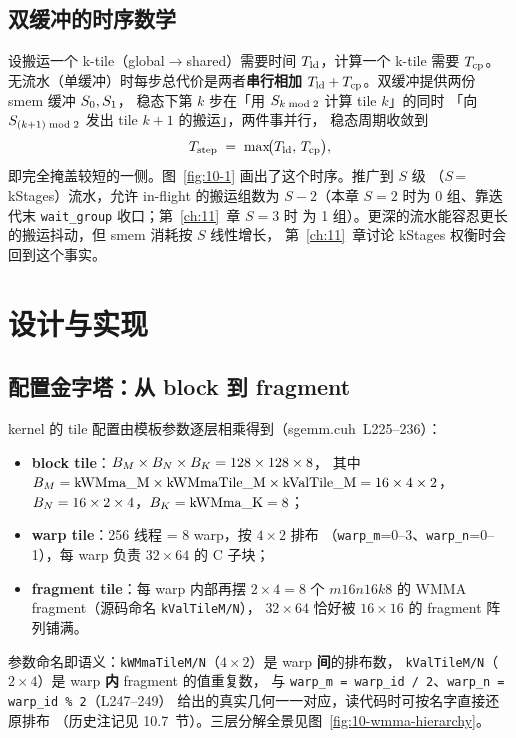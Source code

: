 \subsection{双缓冲的时序数学}

设搬运一个 k-tile（global$\to$shared）需要时间 $T\sb {\mathrm{ld}}$，计算一个
k-tile 需要 $T\sb {\mathrm{cp}}$。无流水（单缓冲）时每步总代价是两者\textbf{串行相加}
$T\sb {\mathrm{ld}} + T\sb {\mathrm{cp}}$。双缓冲提供两份 smem 缓冲 $S\sb 0, S\sb 1$，
稳态下第 $k$ 步在「用 $S\sb {k\bmod 2}$ 计算 tile $k$」的同时
「向 $S\sb {(k+1)\bmod 2}$ 发出 tile $k+1$ 的搬运」，两件事并行，
稳态周期收敛到
\begin{equation}
  T\sb {\mathrm{step}} \;=\; \max\!\bigl(T\sb {\mathrm{ld}},\, T\sb {\mathrm{cp}}\bigr),
  \label{eq:10-pipe}
\end{equation}
即完全掩盖较短的一侧。图~\ref{fig:10-1} 画出了这个时序。推广到 $S$ 级
（$S$\,=\,kStages）流水，允许 in-flight 的搬运组数为 $S-2$（本章 $S{=}2$
时为 0 组、靠迭代末 \texttt{wait\_group} 收口；第~\ref{ch:11}~章 $S{=}3$ 时
为 1 组）。更深的流水能容忍更长的搬运抖动，但 smem 消耗按 $S$ 线性增长，
第~\ref{ch:11}~章讨论 kStages 权衡时会回到这个事实。

\section{设计与实现}

\subsection{配置金字塔：从 block 到 fragment}

kernel 的 tile 配置由模板参数逐层相乘得到（sgemm.cuh~L225--236）：
\begin{itemize}
  \item \textbf{block tile}：$B\sb M \times B\sb N \times B\sb K = 128 \times 128 \times 8$，
        其中 $B\sb M = \mathrm{kWMma\_M}\times\mathrm{kWMmaTile\_M}\times\mathrm{kValTile\_M}
        = 16\times4\times2$，$B\sb N = 16\times2\times4$，$B\sb K = \mathrm{kWMma\_K} = 8$；
  \item \textbf{warp tile}：256 线程 = 8 warp，按 $4\times2$ 排布
        （\texttt{warp\_m}=0--3、\texttt{warp\_n}=0--1），每 warp 负责
        $32\times64$ 的 C 子块；
  \item \textbf{fragment tile}：每 warp 内部再摆 $2\times4 = 8$ 个
        $m16n16k8$ 的 WMMA fragment（源码命名 \texttt{kValTileM/N}），
        $32\times64$ 恰好被 $16\times16$ 的 fragment 阵列铺满。
\end{itemize}
参数命名即语义：\texttt{kWMmaTileM/N}（$4\times2$）是 warp \textbf{间}的排布数，
\texttt{kValTileM/N}（$2\times4$）是 warp \textbf{内} fragment 的值重复数，
与 \texttt{warp\_m = warp\_id / 2}、\texttt{warp\_n = warp\_id \% 2}（L247--249）
给出的真实几何一一对应，读代码时可按名字直接还原排布
（历史注记见 10.7~节）。三层分解全景见图~\ref{fig:10-wmma-hierarchy}。

